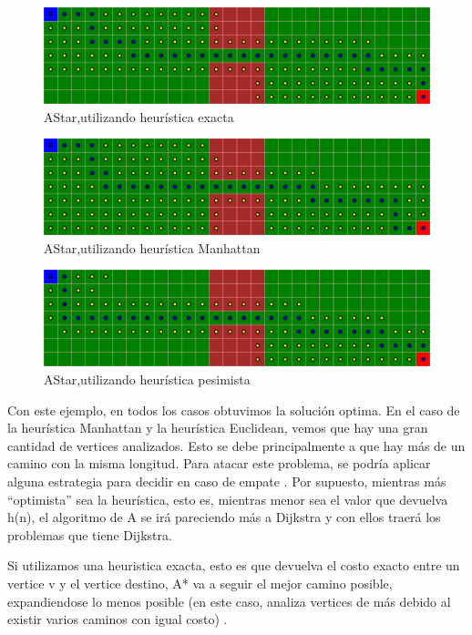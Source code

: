 \begin{figure}[H]
\centering
\includegraphics[width=\textwidth]{AStar/grafo1HeuristicaExacta.png}
\caption{AStar,utilizando heurística exacta}
\end{figure}

\begin{figure}[H]
\centering
\includegraphics[width=\textwidth]{AStar/grafo1HeuristicaManhattan.png}
\caption{AStar,utilizando heurística Manhattan}
\end{figure}

\begin{figure}[H]
\centering
\includegraphics[width=\textwidth]{AStar/grafo1HeuristicaPesimista.png}
\caption{AStar,utilizando heurística pesimista}
\end{figure}

Con este ejemplo, en todos los casos obtuvimos la solución optima. 
En el caso de la heurística Manhattan y la heurística Euclidean, vemos que hay una gran cantidad
de vertices analizados. Esto se debe principalmente a que hay más de un camino con la misma longitud.
Para atacar este problema, se podría aplicar alguna estrategia para decidir en caso de empate \cite{HEURISTICAS}.
Por supuesto, mientras más ``optimista'' sea la heurística, esto es, mientras menor sea el valor que devuelva h(n), 
el algoritmo de A\* se irá pareciendo más a Dijkstra y con ellos traerá los problemas que tiene Dijkstra.


Si utilizamos una heuristica exacta, 
esto es que devuelva el costo exacto entre un vertice v y el vertice destino, 
A* va a seguir el mejor camino posible, expandiendose lo menos posible (en este caso, 
analiza vertices de más debido al existir varios caminos con igual costo) \cite{HEURISTICAS}.


